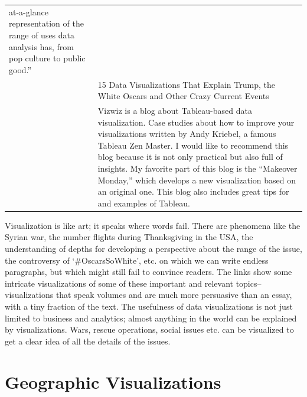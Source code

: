 \documentclass[]{book}
\theoremstyle{definition}
\theoremstyle{definition}
\theoremstyle{definition}
\theoremstyle{remark}
\begin{document}
\begin{longtable}[]{@{}ll@{}}
\begin{minipage}[t]{0.79\columnwidth}
at-a-glance representation of the range of uses data analysis has, from
pop culture to public good.''\strut
\end{minipage}\tabularnewline
\begin{minipage}[t]{0.15\columnwidth}\raggedright\strut
\citep{int_viz_2}\strut
\end{minipage} & \begin{minipage}[t]{0.79\columnwidth}\raggedright\strut
15 Data Visualizations That Explain Trump, the White Oscars and Other
Crazy Current Events\strut
\end{minipage}\tabularnewline
\begin{minipage}[t]{0.15\columnwidth}\raggedright\strut
\citep{vizwiz}\strut
\end{minipage} & \begin{minipage}[t]{0.79\columnwidth}\raggedright\strut
Vizwiz is a blog about Tableau-based data visualization. Case studies
about how to improve your visualizations written by Andy Kriebel, a
famous Tableau Zen Master. I would like to recommend this blog because
it is not only practical but also full of insights. My favorite part of
this blog is the ``Makeover Monday,'' which develops a new visualization
based on an original one. This blog also includes great tips for and
examples of Tableau.\strut
\end{minipage}\tabularnewline
\bottomrule
\end{longtable}

Visualization is like art; it speaks where words fail. There are
phenomena like the Syrian war, the number flights during Thanksgiving in
the USA, the understanding of depths for developing a perspective about
the range of the issue, the controversy of `\#OscarsSoWhite', etc. on
which we can write endless paragraphs, but which might still fail to
convince readers. The links show some intricate visualizations of some
of these important and relevant topics--visualizations that speak
volumes and are much more persuasive than an essay, with a tiny fraction
of the text. The usefulness of data visualizations is not just limited
to business and analytics; almost anything in the world can be explained
by visualizations. Wars, rescue operations, social issues etc. can be
visualized to get a clear idea of all the details of the issues.

\section{Geographic Visualizations}\label{geographic-visualizations}
\end{document}
